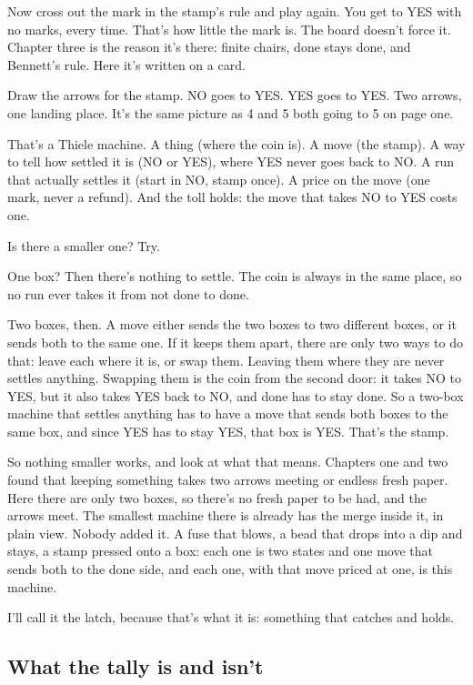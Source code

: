 \documentclass[11pt,twoside]{article}
\theoremstyle{thielethm}
\theoremstyle{thieledef}
\theoremstyle{thieledef}
\theoremstyle{thieledef}
\theoremstyle{thielethm}
\theoremstyle{thieleobs}
\theoremstyle{thielethm}
\begin{document}
Now cross out the mark in the stamp's rule and play again. You get to YES with no marks, every time. That's how little the mark is. The board doesn't force it. Chapter three is the reason it's there: finite chairs, done stays done, and Bennett's rule. Here it's written on a card.

Draw the arrows for the stamp. NO goes to YES. YES goes to YES. Two arrows, one landing place. It's the same picture as 4 and 5 both going to 5 on page one.

That's a Thiele machine. A thing (where the coin is). A move (the stamp). A way to tell how settled it is (NO or YES), where YES never goes back to NO. A run that actually settles it (start in NO, stamp once). A price on the move (one mark, never a refund). And the toll holds: the move that takes NO to YES costs one.

Is there a smaller one? Try.

One box? Then there's nothing to settle. The coin is always in the same place, so no run ever takes it from not done to done.

Two boxes, then. A move either sends the two boxes to two different boxes, or it sends both to the same one. If it keeps them apart, there are only two ways to do that: leave each where it is, or swap them. Leaving them where they are never settles anything. Swapping them is the coin from the second door: it takes NO to YES, but it also takes YES back to NO, and done has to stay done. So a two-box machine that settles anything has to have a move that sends both boxes to the same box, and since YES has to stay YES, that box is YES. That's the stamp.

So nothing smaller works, and look at what that means. Chapters one and two found that keeping something takes two arrows meeting or endless fresh paper. Here there are only two boxes, so there's no fresh paper to be had, and the arrows meet. The smallest machine there is already has the merge inside it, in plain view. Nobody added it. A fuse that blows, a bead that drops into a dip and stays, a stamp pressed onto a box: each one is two states and one move that sends both to the done side, and each one, with that move priced at one, is this machine.

I'll call it the latch, because that's what it is: something that catches and holds.

\subsection{What the tally is and isn't}
\end{document}
